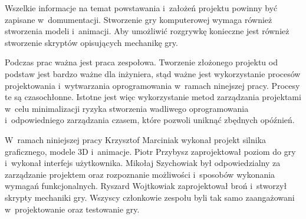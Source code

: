 Wszelkie informacje na temat  powstawania i~założeń projektu powinny być zapisane w~domumentacji. Stworzenie gry komputerowej wymaga również stworzenia modeli i~animacji. Aby umożliwić rozgrywkę konieczne jest również stworzenie skryptów opisujących mechanikę gry.  

Podczas prac ważna jest praca zespołowa. Tworzenie złożonego projektu od podstaw jest bardzo ważne dla inżyniera, stąd ważne jest wykorzystanie procesów projektowania i~wytwarzania oprogramowania w~ramach ninejszej pracy. Procesy te są czasochłonne. Istotne jest więc wykorzystanie metod zarządzania projektami w~celu minimalizacji ryzyka stworzenia wadliwego oprogramowania i~odpowiedniego zarządzania czasem, które pozwoli uniknąć zbędnych opóźnień. 

W~ramach niniejszej pracy Krzysztof Marciniak wykonał projekt silnika graficznego, modele 3D i~animacje. 
Piotr Przybysz zaprojektował poziom do gry i~wykonał interfejs użytkownika. 
Mikołaj Szychowiak był odpowiedzialny za zarządzanie projektem oraz rozpoznanie możliwości i~sposobów wykonania wymagań funkcjonalnych.
Ryszard Wojtkowiak zaprojektował broń i~stworzył skrypty mechaniki gry.
Wszyscy członkowie zespołu byli tak samo zaangażowani w~projektowanie oraz testowanie gry.
